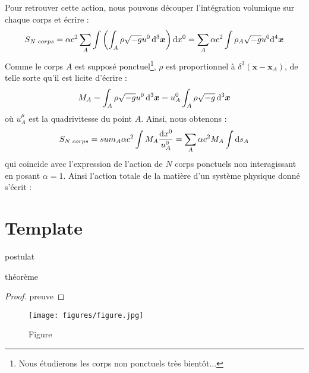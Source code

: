 			Pour retrouver cette action, nous pouvons découper l'intégration volumique sur chaque corps et écrire :
			\begin{equation}
				S_{N\phantom{l}corps}= \alpha c^2 \sum_A \int \left( \int_A \rho \sqrt{-g} u^0 \, \mathrm{d}^3\bm{x} \right) \mathrm{d} x^0 = \sum_A \alpha c^2 \int \rho_A \sqrt{-g} u^0 \mathrm{d}^4\bm{x}
			\end{equation}
			Comme le corps $A$ est supposé ponctuel\footnote{Nous étudierons les corps non ponctuels très bientôt...}, $\rho$ est proportionnel à $\delta^3(\bm{x}-\bm{x}_A)$, de telle sorte qu'il est licite d'écrire :
			\begin{equation}
				M_A = \int_A \rho \sqrt{-g} u^0 \, \mathrm{d}^3\bm{x} = u^0_A \int_A \rho \sqrt{-g} \, \mathrm{d}^3\bm{x} 
			\end{equation}
			où $u^\mu_A$ est la quadrivitesse du point $A$. Ainsi, nous obtenons :
			\begin{equation}
				S_{N\phantom{l}corps}=sum_A \alpha c^2 \int M_A \frac{\mathrm{d} x^0}{u^0_A} = \sum_A \alpha c^2 M_A \int \mathrm{d} s_A
			\end{equation}
			qui coïncide avec l'expression de l'action de $N$ corps ponctuels non interagissant en posant $\alpha=1$.
			Ainsi l'action totale de la matière d'un système physique donné s'écrit :


	\section{Template}
		\begin{post}
			postulat
		\end{post}
		\begin{theorem}
			théorème
		\end{theorem}

		\begin{proof}
			preuve
			\end{proof}


		\begin{figure}
			\centering
			\texttt{[image: figures/figure.jpg]}
			\caption{Figure}
		\label{fig}
		\end{figure}
